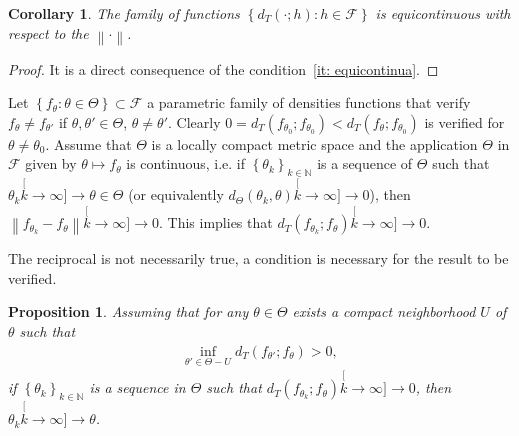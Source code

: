 \documentclass[journal]{IEEEtran}
\newtheorem{proposition}{Proposition}
\numberwithin{equation}{section}
\newtheorem{corollary}{Corollary}[section]
\newenvironment{dem}[1][Proof]{\begin{proof}[{\it #1}]}{\end{proof}}
\newcommand{\N}{\ensuremath{\mathbb{N}}}
\newcommand{\norm}[1]{\ensuremath{\left\| #1 \right\|}}
\newcommand{\pa}[1]{\ensuremath{\left( #1 \right)}}
\newcommand{\set}[1]{\ensuremath{\left\{ #1 \right\}}}
\begin{document}
\begin{corollary}
	The family of functions $\set{d_{T}\pa{\cdot;h}: h\in\mathcal{F}}$ is equicontinuous with respect to the $\norm{\cdot}$.
	\label{equicont}
\end{corollary}
\begin{dem}
	It is a direct consequence of the condition~\eqref{it: equicontinua}.
\end{dem}


Let $\set{f_{\theta}:\theta\in\Theta}\subset\mathcal{F}$ a parametric family of densities functions that verify $f_{\theta} \ne f_{\theta'}$ if $\theta,\theta'\in\Theta$, $\theta\ne\theta'$.
Clearly $0 = d_{T}\pa{f_{\theta_{0}};f_{\theta_{0}}} < d_{T}\pa{f_{\theta};f_{\theta_{0}}}$ is verified for
$\theta\ne\theta_{0}$.
Assume that $\Theta$ is a locally compact metric space and the application $\Theta$
in $\mathcal{F}$ given by $\theta\mapsto f_{\theta}$ is continuous, i.e.
if $\set{\theta_{k}}_{k\in\N}$ is a sequence of $\Theta$ such that
$\theta_{k}\stackrel[k\to\infty]{}{\longrightarrow}\theta\in\Theta$ (or equivalently $d_{\Theta}\pa{\theta_{k},\theta}\stackrel[k\to\infty]{}{\longrightarrow} 0$), then $\norm{f_{\theta_{k}}-f_{\theta}}\stackrel[k\to\infty]{}{\longrightarrow} 0$. This implies that $d_{T}\pa{f_{\theta_{k}};f_{\theta}}\stackrel[k\to\infty]{}{\longrightarrow}  0$.

The reciprocal is not necessarily true, a condition is necessary for the result to be verified.

\begin{proposition}
	\label{pr: convergencia}
	Assuming that for any $\theta\in\Theta$ exists a compact neighborhood $U$ of $\theta$ such that
	\begin{align}
	\label{eq: inf>0}
	\inf_{\theta'\in \Theta-U}d_{T}\pa{f_{\theta'};f_{\theta}}>0,
	\end{align}
	if $\set{\theta_{k}}_{k\in\N}$ is a sequence in $\Theta$ such that $d_{T}\pa{f_{\theta_{k}};f_{\theta}}\stackrel[k\to\infty]{}{\longrightarrow}  0$, then $\theta_{k}\stackrel[k\to\infty]{}{\longrightarrow} \theta$.
\end{proposition}
\end{document}
